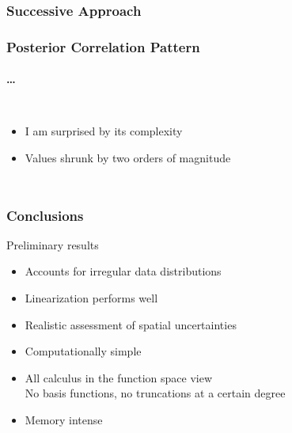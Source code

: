 \documentclass[aspectratio=169, t, 10pt]{beamer}
\begin{document}
\begin{frame}
    \frametitle{Successive Approach}
    \begin{center}
    \end{center}
\end{frame}


\begin{frame}
    \frametitle{Posterior Correlation Pattern}
    \framesubtitle{\dots }

\begin{columns}
%
    \begin{itemize}
        \item I am surprised by its complexity
        \item Values shrunk by two orders of magnitude
    \end{itemize}

    \vspace{-10mm}

\end{columns}

\end{frame}


\begin{frame}
    \frametitle{Conclusions}

    

    Preliminary results
    \begin{itemize}
        \item Accounts for irregular data distributions
        \item Linearization performs well
        \item Realistic assessment of spatial uncertainties
        \item Computationally simple
        \item All calculus in the function space view \\
              No basis functions, no truncations at a certain degree
        \item Memory intense
    \end{itemize}


\end{frame}
\end{document}
